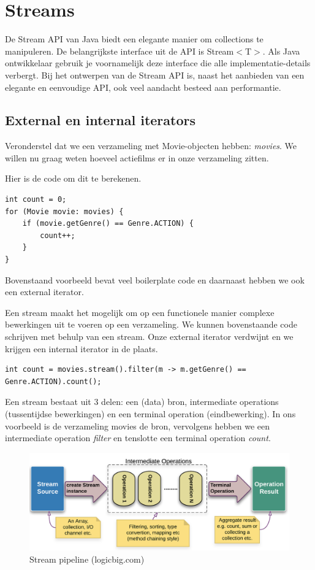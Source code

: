\chapter{Streams}

\begin{summary}
De Stream API van Java biedt een elegante manier om collections te manipuleren. De belangrijkste interface uit de API is Stream$<$T$>$. Als Java ontwikkelaar gebruik je voornamelijk deze interface die alle implementatie-details verbergt. Bij het ontwerpen van de Stream API is, naast het aanbieden van een elegante en eenvoudige API, ook veel aandacht besteed aan performantie. 
\end{summary}

\section{External en internal iterators}

Veronderstel dat we een verzameling met Movie-objecten hebben: \textit{movies}. We willen nu graag weten hoeveel actiefilms er in onze verzameling zitten.

Hier is de code om dit te berekenen.

\begin{lstlisting}
int count = 0;
for (Movie movie: movies) {
    if (movie.getGenre() == Genre.ACTION) {
        count++;
    }
}
\end{lstlisting}

Bovenstaand voorbeeld bevat veel boilerplate code en daarnaast hebben we ook een external iterator. 

Een stream maakt het mogelijk om op een functionele manier complexe bewerkingen uit te voeren op een verzameling.
We kunnen bovenstaande code schrijven met behulp van een stream. Onze external iterator verdwijnt en we krijgen een internal iterator in de plaats.

\begin{lstlisting}
int count = movies.stream().filter(m -> m.getGenre() == Genre.ACTION).count();
\end{lstlisting}

Een stream bestaat uit 3 delen: een (data) bron, intermediate operations (tussentijdse bewerkingen) en een terminal operation (eindbewerking). In ons voorbeeld is de verzameling movies de bron, vervolgens hebben we een intermediate operation \textit{filter} en tenslotte een terminal operation \textit{count}.

\begin{figure}[H]
  \includegraphics[width=\linewidth]{images/chapter_streams/stream_pipeline.png}
  \caption{Stream pipeline (logicbig.com)}
  \label{fig:stream_of}
\end{figure}


